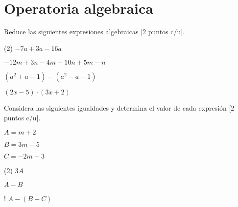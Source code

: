 \documentclass[sin curso]{plantilla-evaluacion-v1}
\begin{document}
\section{Operatoria algebraica}

Reduce las siguientes expresiones algebraicas [2 puntos c/u].

\begin{preguntas}(2)
  \pregunta $-7a + 3a - 16a$
  \begin{malla}[height=3cm]
  \end{malla}
  \pregunta $-12m +3n -4m -10n +5m-n$
  \begin{malla}[height=3cm]
  \end{malla}
  \pregunta $(a^2+a-1)-(a^2-a+1)$
  \begin{malla}[height=4cm]
  \end{malla}
  \pregunta $(2x-5)\cdot(3x+2)$
  \begin{malla}[height=4cm]
  \end{malla}

\end{preguntas}

Considera las siguientes igualdades y determina el valor de cada expresión [2 puntos c/u].
\vspace*{3mm}
\begin{tcbraster}[raster columns=3,raster width=.7\linewidth,raster column skip=20pt,
  raster halign=center,halign=center,borderline={1pt}{0pt}{black,dashed},
  colframe=white,colback=white]
  \begin{tcolorbox}
    $A = m + 2$
  \end{tcolorbox}
  \begin{tcolorbox}
    $B = 3m -5$
  \end{tcolorbox}
  \begin{tcolorbox}
    $C = -2m + 3$
  \end{tcolorbox}
\end{tcbraster}
\vspace*{5mm}

\begin{preguntas}(2)
  \pregunta $3A$
  \begin{malla}[height=4cm]
  \end{malla}
  \pregunta $A-B$
  \begin{malla}[height=4cm]
  \end{malla}
  \pregunta! $A-(B-C)$
  \begin{malla}[height=4cm]
  \end{malla}

\end{preguntas}
\end{document}
